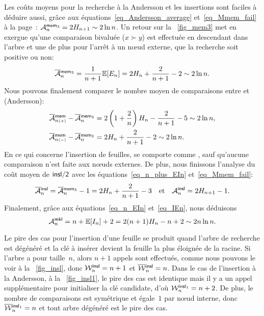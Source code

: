Les coûts moyens pour la recherche à la Andersson et les insertions
sont faciles à déduire aussi, grâce aux
équations~\eqref{eq_Andersson_average} 
et~\eqref{eq_Mmem_fail} à la page~\pageref{eq_Mmem_fail}:
\(\M{\fun{mem}_3}{n} = 2H_{n+1} \sim 2 \ln
n\). Un retour sur la
\fig~\vref{fig_mem3} met en exergue qu'une comparaison bivaluée (\(x
\succ y\)) est effectuée en descendant dans l'arbre et une de plus
pour l'arrêt à un n{\oe}ud externe, que la recherche soit positive ou
non:
\begin{equation*}
  \OM{\fun{mem}_3}{n} = \frac{1}{n+1}\Expected{E_n} =
  2H_n + \frac{2}{n+1} - 2 \sim 2\ln n.
\end{equation*}
Nous pouvons finalement comparer le nombre moyen de comparaisons entre
 et  (Andersson):
\begin{align*}
  \OM{\fun{mem}}{n{\scriptscriptstyle(+)}} - \OM{\fun{mem}_3}{n}
&= 2\left(1 + \frac{2}{n}\right)H_n - \frac{2}{n+1} - 5 \sim 2\ln n,\\
  \OM{\fun{mem}}{n{\scriptscriptstyle(-)}} - \OM{\fun{mem}_3}{n}
&= 2H_n + \frac{2}{n+1} - 2 \sim 2\ln n.
\end{align*}
En ce qui concerne l'insertion de feuilles,
 se comporte comme
, sauf qu'aucune
comparaison n'est faite aux n{\oe}uds externes. De plus, nous
finissons l'analyse du coût moyen de \(\fun{insl/2}\) avec les
équations~\eqref{eq_n_plus_EIn} et~\eqref{eq_Mmem_fail}:
\begin{equation*}
  \OM{\fun{insl}}{n} =
  \OM{\fun{mem}_3}{n} - 1 = 2H_n + \frac{2}{n+1} -
  3\quad\text{et}\quad \M{\fun{insl}}{n} = 2H_{n+1} - 1.
\index{insl@$\OM{\fun{insl}}{n}$}
\index{mem3@$\OM{\fun{mem}_3}{n}$}
\end{equation*}
Finalement, grâce aux équations~\eqref{eq_n_EIn} et~\eqref{eq_IEn},
nous déduisons
\begin{equation}
\M{\fun{mkl}}{n} = n + \Expected{I_n} + 2 = 2(n+1)H_n - n + 2
\sim 2n\ln n.
\index{mkl@$\M{\fun{mkl}}{n}$}
\label{eq_Mmkl}
\end{equation}


Le pire des cas pour l'insertion d'une feuille se produit quand
l'arbre de recherche est dégénéré
et la clé à insérer devient la feuille la plus éloignée de la racine.
Si l'arbre a pour taille~\(n\), alors \(n+1\) appels sont effectués,
comme nous pouvons le voir à la \fig~\vref{fig_insl}, donc
\(\W{\fun{insl}}{n} = n + 1\) et
\(\OW{\fun{insl}}{n} = n\). Dans le
cas de l'insertion à la Andersson, à la \fig~\vref{fig_insl1}, le pire
des cas est identique mais il y a un appel supplémentaire pour
initialiser la clé candidate, d'où \(\W{\fun{insl}_1}{n} = n +
2\). De plus, le nombre de
comparaisons est symétrique et égale~\(1\) par n{\oe}ud interne, donc
\(\OW{\fun{insl}_1}{n} = n\) et
tout arbre dégénéré est le pire des cas.

